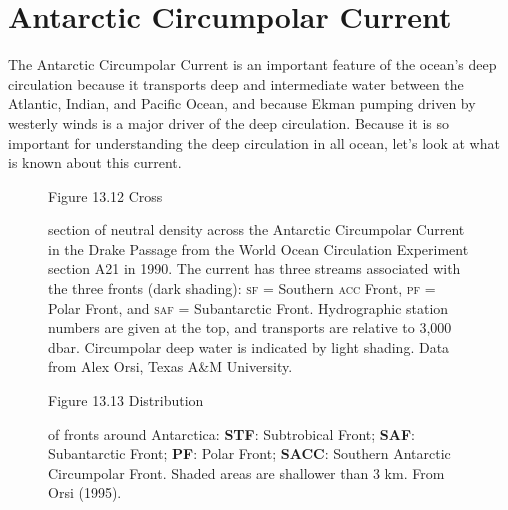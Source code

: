 \section{Antarctic Circumpolar Current}
The Antarctic Circumpolar Current is an important feature of the ocean's deep circulation because it transports deep and intermediate water
between the Atlantic, Indian, and Pacific Ocean, and because Ekman pumping driven by westerly winds is a major driver of the deep circulation. Because it is so important for understanding the deep circulation in all ocean, let's look at what is known about this current.

\begin{figure}[t!] %
{}
\footnotesize
Figure 13.12 Cross \rule{0mm}{3ex}section of neutral density across the Antarctic Circumpolar Current in the Drake Passage from the World Ocean Circulation Experiment section A21 in 1990. The current has three streams associated with the three fronts (dark shading): \textsc{sf} = Southern \textsc{acc} Front, \textsc{pf} = Polar Front, and \textsc{saf} = Subantarctic Front. Hydrographic station numbers are given at the top, and transports are relative to 3,000 dbar. Circumpolar deep water is indicated by light shading.  Data from Alex Orsi, Texas A\&M
University.

\label{fig:P16}
\vspace{-5ex}
\end{figure}

\begin{figure}[t!] %
{}
\footnotesize
Figure 13.13 Distribution \rule{0mm}{3ex}of fronts around Antarctica:
\textbf{STF}: Subtrobical Front; \textbf{SAF}: Subantarctic Front;
\textbf{PF}: Polar Front; \textbf{SACC}: Southern Antarctic Circumpolar Front. Shaded areas
are shallower than 3 km. From Orsi (1995).

\label{fig:AACx-section}
\vspace{-3ex}
\end{figure}

